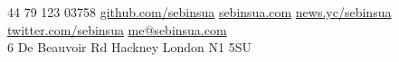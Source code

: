 \documentclass[10pt,a4paper]{article}
\begin{document}
\sloppy  %


\nobreakvspace{0.3em}  %

\noindent\textsmaller{+}44 79 123 03758\sbull
\href{http://github.com/sebinsua}{github.com/sebinsua}\sbull
\href{http://sebinsua.com}{sebinsua.com}\sbull
\href{https://news.ycombinator.com/user?id=lhnz}{news.yc/sebinsua}\sbull
\href{http://twitter.com/sebinsua}{twitter.com/sebinsua}\sbull
\href{mailto:me@sebinsua.com}{me\mbox{}@\mbox{}sebinsua.com}
\\
6 De Beauvoir Rd\sbull
Hackney\sbull
London\sbull
N1 5SU

\spacedhrule{0.9em}{-0.4em}  %

\end{document}
